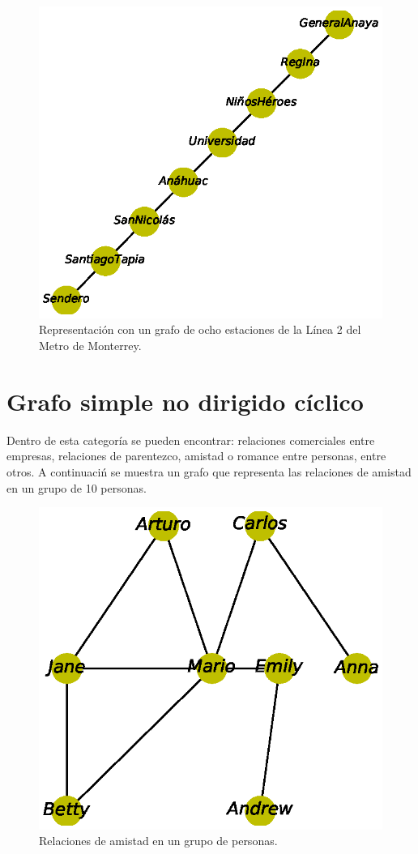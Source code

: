 \documentclass{article}
\begin{document}


\begin{figure}
  \includegraphics[width=.8\columnwidth]{1.eps}
  \caption{Representación con un grafo de ocho estaciones de la Línea 2 del Metro de Monterrey.}
  \label{fig:1}
\end{figure}

\section{Grafo simple no dirigido cíclico}

Dentro de esta categoría se pueden encontrar: relaciones comerciales entre empresas, relaciones de parentezco, amistad o romance entre personas, entre otros. 
 A continuaci\'n se muestra un grafo que representa las relaciones de amistad en un grupo de 10 personas.
 


\begin{figure}
  \includegraphics[width=.8\columnwidth]{2.eps}
  \caption{Relaciones de amistad en un grupo de personas.}
  \label{fig:2}
\end{figure}
\end{document}
